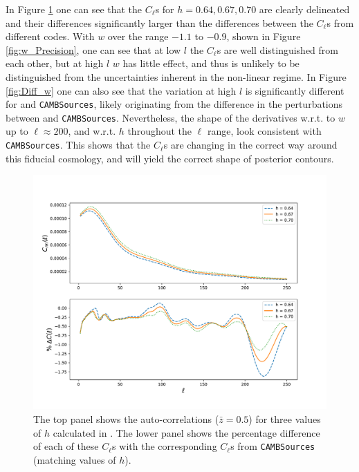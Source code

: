 \qquad In Figure \ref{fig:h_Precision} one can see that the $C_{\ell}$s for $h = 0.64, 0.67, 0.70$ are clearly delineated and their differences significantly larger than the differences between the $C_{\ell}$s from different codes. With $w$ over the range $-1.1$ to $-0.9$, shown in Figure \ref{fig:w_Precision}, one can see that at low $l$ the $C_{\ell}$s are well distinguished from each other, but at high $l$ $w$ has little effect, and thus is unlikely to be distinguished from the uncertainties inherent in the non-linear regime. In Figure \ref{fig:Diff_w} one can also see that the variation at high $l$ is significantly different for \uclcl and \texttt{CAMBSources}, likely originating from the difference in the perturbations between \class and \texttt{CAMBSources}. Nevertheless, the shape of the derivatives w.r.t. to $w$ up to $\ell \approx 200$, and w.r.t. $h$ throughout the $\ell$ range, look consistent with \texttt{CAMBSources}. This shows that the $C_{\ell}$s are changing in the correct way around this fiducial cosmology, and will yield the correct shape of posterior contours. 

\begin{figure}
\begin{center}
\includegraphics[scale=0.60]{BOSS-FIGS/PrecH.pdf}
\caption[Auto-correlations ($\bar z = 0.5$) for three values of $h$ calculated in \uclcl and comparison between \class and \texttt{CAMBSources}]{The top panel shows the auto-correlations ($\bar z = 0.5$) for three values of $h$ calculated in \uclcl. The lower panel shows the percentage difference of each of these $C_{\ell}$s with the corresponding $C_{\ell}$s from \texttt{CAMBSources} (matching values of $h$).}
\label{fig:h_Precision}
\end{center}
\end{figure}

